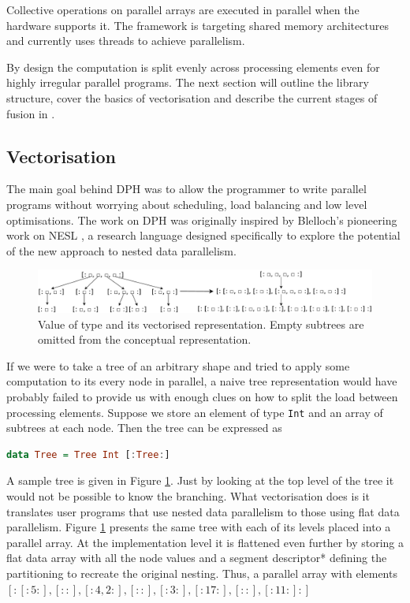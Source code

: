 \documentclass[preamble.tex]{subfiles}
\begin{document}
Collective operations on parallel arrays are executed in parallel when the hardware supports it. The framework is targeting shared memory architectures and currently uses \Haskell threads \cite{Jones08atutorial} to achieve parallelism.

By design the computation is split evenly across processing elements even for highly irregular parallel programs. The next section will outline the library structure, cover the basics of vectorisation and describe the current stages of fusion in \DPH.




\subsection{Vectorisation}
\label{sec:Vectorisation}

The main goal behind DPH was to allow the programmer to write parallel programs without worrying about scheduling, load balancing and low level optimisations. The work on DPH was originally inspired by Blelloch's pioneering work on NESL \cite{BCH+}, a research language designed specifically to explore the potential of the new approach to nested data parallelism.

\begin{figure}
\includegraphics[width=1\textwidth]{img/TreeRepr}

\caption{\label{fig:Tree}{Value of type \code{[:Tree:]} and its vectorised representation. Empty subtrees are omitted from the conceptual representation.}}
\end{figure}


If we were to take a tree of an arbitrary shape and tried to apply some computation to its every node in parallel, a naive tree representation would have probably failed to provide us with enough clues on how to split the load between processing elements. Suppose we store an element of type \texttt{Int} and an array of subtrees at each node. Then the tree can be expressed as

\begin{lstlisting}[basicstyle={\ttfamily},language=Haskell,tabsize=4]
data Tree = Tree Int [:Tree:]
\end{lstlisting}


A sample tree is given in Figure \ref{fig:Tree}. Just by looking at the top level of the tree it would not be possible to know the branching. What vectorisation does is it translates user programs that use nested data parallelism to those using flat data parallelism. Figure \ref{fig:Tree} presents the same tree with each of its levels placed into a parallel array. At the implementation level it is flattened even further by storing a flat data array with all the node values and a \*segment descriptor*\isegd{} defining the partitioning to recreate the original nesting. Thus, a parallel array with elements $[: [:5:],[::],[:4,2:],[::],[:3:],[:17:],[::],[:11:] :]$
\end{document}
